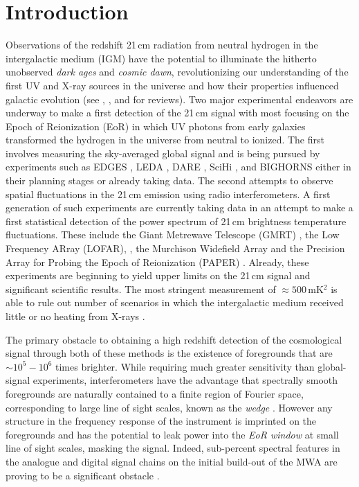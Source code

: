 \documentclass[twocolumn]{emulateapj}
\begin{document}
\section{Introduction}
Observations of the redshift 21\,cm radiation from neutral hydrogen in the intergalactic medium (IGM) have the potential to illuminate the hitherto unobserved {\it dark ages} and {\it cosmic dawn}, revolutionizing our understanding of the first UV and X-ray sources in the universe and how their properties influenced galactic evolution (see \citet{Furlanetto:2006Review}, \citet{Morales:2010}, and \citet{Pritchard:2012} for reviews). Two major experimental endeavors are underway to make a first detection of the 21\,cm signal with most focusing on the Epoch of Reionization (EoR) in which UV photons from early galaxies transformed the hydrogen in the universe from neutral to ionized. The first involves measuring the sky-averaged global signal and is being pursued by experiments such as EDGES \citep{Bowman:2010}, LEDA \citep{Greenhill:2012,Bernardi:2015}, DARE \citep{Burns:2012}, SciHi \citep{Voytek:2014}, and BIGHORNS \citep{Sokolowski:2015} either in their planning stages or already taking data. The second attempts to observe spatial  fluctuations in the 21\,cm emission using radio interferometers. A first generation of such experiments are currently taking data in an attempt to make a first statistical detection of the power spectrum of 21\,cm brightness temperature fluctuations. These include the Giant Metrewave Telescope (GMRT)  \citep{Paciga:2013}, the Low Frequency ARray (LOFAR), \citep{VanHaarlem:2013}, the Murchison Widefield Array \citep{Tingay:2013a} and the Precision Array for Probing the Epoch of Reionization (PAPER) \citep{Parsons:2010}. Already, these experiments are beginning to yield upper limits on the 21\,cm signal \citep{Dillon:2013,Parsons:2014,Jacobs:2015,Dillon:2015,EwallWice:2015a} and significant scientific results. The most stringent measurement of $\approx 500$\,mK$^2$ \citep{Ali:2015} is able to rule out number of scenarios in which the intergalactic medium received little or no heating from X-rays \citep{Pober:2015,Greig:2015b}. 

The primary obstacle to obtaining a high redshift detection of the cosmological signal through both of these methods is the existence of foregrounds that are $\sim 10^5-10^6$ times brighter. While requiring much greater sensitivity than global-signal experiments, interferometers have the advantage that spectrally smooth foregrounds are naturally contained to a finite region of Fourier space, corresponding to large line of sight scales, known as the {\it wedge} \citep{Datta:2010,Vedantham:2012,Parsons:2012,Thyagarajan:2013,Liu:2014a,Liu:2014b}. However any structure in the frequency response of the instrument is imprinted on the foregrounds and has the potential to leak power into the {\it EoR window} at small line of sight scales, masking the signal. Indeed, sub-percent spectral features in the analogue and digital signal chains on the initial build-out of the MWA are proving to be a significant obstacle \citep{Dillon:2015b,EwallWice:2015a,Beardsley:2015b}. 
\end{document}
